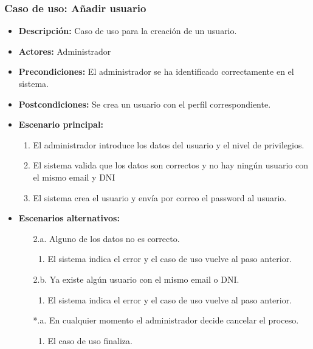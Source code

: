 \subsubsection*{Caso de uso: Añadir usuario}
\label{add_usuario}
\begin{itemize}
\item{\bf Descripción:} Caso de uso para la creación de un usuario.
\item{\bf Actores:} Administrador
\item{\bf Precondiciones:} El administrador se ha identificado correctamente en el sistema.
\item{\bf Postcondiciones:} Se crea un usuario con el perfil correspondiente.
\item{\bf Escenario principal:}
\begin{enumerate}
\item El administrador introduce los datos del usuario y el nivel de privilegios.
\item El sistema valida que los datos son correctos y no hay ningún usuario con el mismo email y DNI
\item El sistema crea el usuario y envía por correo el password al usuario.
\end{enumerate}
\item{\bf Escenarios alternativos:}
\begin{itemize}
\item[2.a.] Alguno de los datos no es correcto.
\begin{enumerate}
\item El sistema indica el error y el caso de uso vuelve al paso anterior.
\end{enumerate}
\item[2.b.] Ya existe algún usuario con el mismo email o DNI.
\begin{enumerate}
\item El sistema indica el error y el caso de uso vuelve al paso anterior.
\end{enumerate}
\item[*.a.] En cualquier momento el administrador decide cancelar el proceso.
\begin{enumerate}
\item El caso de uso finaliza.
\end{enumerate}
\end{itemize}
\end{itemize}

